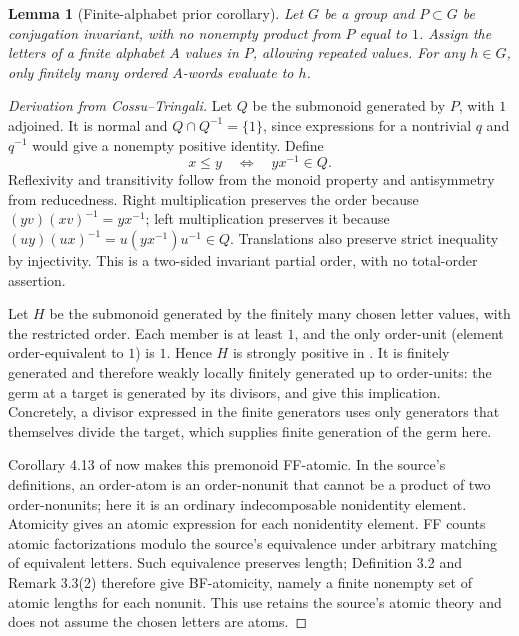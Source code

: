 \documentclass[11pt]{article}
\newtheorem{lemma}[theorem]{Lemma}
\begin{document}
\begin{lemma}[Finite-alphabet prior corollary]\label{lem:fiber}
Let $G$ be a group and $P\subset G$ be conjugation invariant, with no nonempty product from $P$ equal to $1$. Assign the letters of a finite alphabet $A$ values in $P$, allowing repeated values. For any $h\in G$, only finitely many ordered $A$-words evaluate to $h$.
\end{lemma}
\begin{proof}[Derivation from Cossu--Tringali]
Let $Q$ be the submonoid generated by $P$, with $1$ adjoined. It is normal and $Q\cap Q^{-1}=\{1\}$, since expressions for a nontrivial $q$ and $q^{-1}$ would give a nonempty positive identity. Define
\[
x\leq y\quad\Longleftrightarrow\quad yx^{-1}\in Q.
\]
Reflexivity and transitivity follow from the monoid property and antisymmetry from reducedness. Right multiplication preserves the order because $(yv)(xv)^{-1}=yx^{-1}$; left multiplication preserves it because $(uy)(ux)^{-1}=u(yx^{-1})u^{-1}\in Q$. Translations also preserve strict inequality by injectivity. This is a two-sided invariant partial order, with no total-order assertion.

Let $H$ be the submonoid generated by the finitely many chosen letter values, with the restricted order. Each member is at least $1$, and the only order-unit (element order-equivalent to $1$) is $1$. Hence $H$ is strongly positive in \cite[Definition 2.3]{CT}. It is finitely generated and therefore weakly locally finitely generated up to order-units: the germ at a target is generated by its divisors, and \cite[Definition 4.1, Lemma 4.2 and Proposition 4.3]{CT} give this implication. Concretely, a divisor expressed in the finite generators uses only generators that themselves divide the target, which supplies finite generation of the germ here.

Corollary 4.13 of \cite{CT} now makes this premonoid FF-atomic. In the source's definitions, an order-atom is an order-nonunit that cannot be a product of two order-nonunits; here it is an ordinary indecomposable nonidentity element. Atomicity gives an atomic expression for each nonidentity element. FF counts atomic factorizations modulo the source's equivalence under arbitrary matching of equivalent letters. Such equivalence preserves length; Definition 3.2 and Remark 3.3(2) therefore give BF-atomicity, namely a finite nonempty set of atomic lengths for each nonunit. This use retains the source's atomic theory and does not assume the chosen letters are atoms.


\end{proof}
\end{document}
